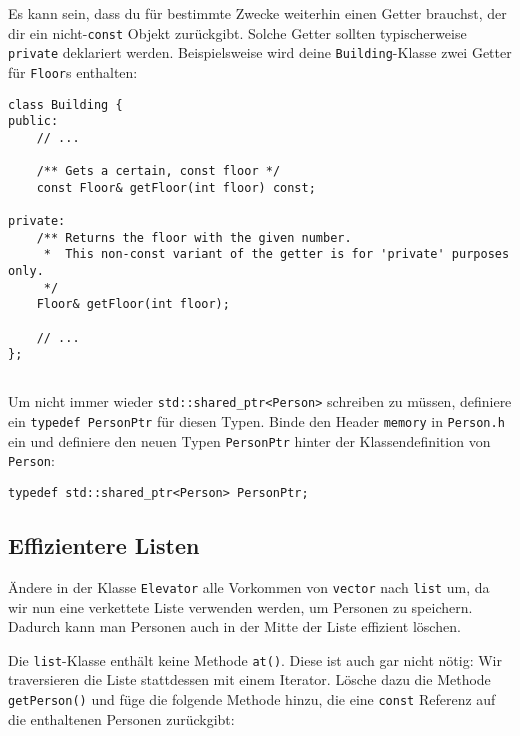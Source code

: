Es kann sein, dass du für bestimmte Zwecke weiterhin einen Getter brauchst, der dir ein nicht-\texttt{const} Objekt zurückgibt.
Solche Getter sollten typischerweise \texttt{private} deklariert werden.
Beispielsweise wird deine \texttt{Building}-Klasse zwei Getter für \texttt{Floor}s enthalten:
\begin{lstlisting}
class Building {
public:
    // ...

    /** Gets a certain, const floor */
    const Floor& getFloor(int floor) const;

private:
    /** Returns the floor with the given number. 
     *  This non-const variant of the getter is for 'private' purposes only. 
     */
    Floor& getFloor(int floor);

    // ...
};
\end{lstlisting}


\subsection{}
Um nicht immer wieder \texttt{std::shared\_ptr<Person>} schreiben zu müssen, definiere ein \texttt{typedef PersonPtr} für diesen Typen.
Binde den Header \texttt{memory} in \texttt{Person.h} ein und definiere den neuen Typen \texttt{PersonPtr} hinter der Klassendefinition von \texttt{Person}:

\begin{lstlisting}
typedef std::shared_ptr<Person> PersonPtr;
\end{lstlisting}

\subsection{Effizientere Listen}
Ändere in der Klasse \texttt{Elevator} alle Vorkommen von \texttt{vector} nach \texttt{list} um, da wir nun eine verkettete Liste verwenden werden, um Personen zu speichern.
Dadurch kann man Personen auch in der Mitte der Liste effizient löschen.

Die \texttt{list}-Klasse enthält keine Methode \texttt{at()}.
Diese ist auch gar nicht nötig:
Wir traversieren die Liste stattdessen mit einem Iterator.
Lösche dazu die Methode \texttt{getPerson()} und füge die folgende Methode hinzu, die eine \texttt{const} Referenz auf die enthaltenen Personen zurückgibt:

